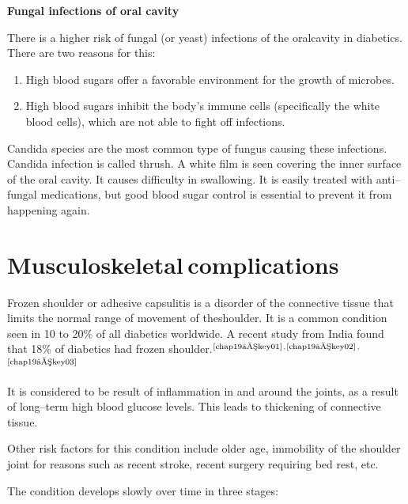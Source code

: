 \noindent\textbf{Fungal infections of oral cavity}

There is a higher risk of fungal (or yeast) infections of the oral\break cavity in diabetics. There are two reasons for this:

\begin{enumerate}[•]
\itemsep=0pt
\item High blood sugars offer a favorable environment for the growth of microbes.
\item High blood sugars inhibit the body’s immune cells (specifically the white blood cells), which are not able to fight off infections.
\end{enumerate}

Candida species are the most common type of fungus causing these infections. Candida infection is called thrush. A white film is seen covering the inner surface of the oral cavity. It causes difficulty in swallowing. It is easily treated with anti–fungal medications, but good blood sugar control is essential to prevent it from happening again.

\newpage

\renewcommand{\thechapter}{\arabic{chapter}}
\chapter{Musculoskeletal complications}\label{chap19}


\vskip 6pt
Frozen shoulder or adhesive capsulitis is a disorder of the conne\-ctive tissue that limits the normal range of movement of the\break shoulder. It is a common condition seen in 10 to 20\% of all diabetics worldwide. A recent study from India found that 18\% of diabetics had frozen shoulder.$^{\text{\cite{chap19–key01}}}$$^,$$^{\text{\cite{chap19–key02}}}$$^,$$^{\text{\cite{chap19–key03}}}$


It is considered to be result of inflammation in and around the joints, as a result of long–term high blood glucose levels. This leads to thicke\-ning of connective tissue.


Other risk factors for this condition include older age, immobility of the shoulder joint for reasons such as recent stroke, recent surgery requiring bed rest, etc.

\vskip 5pt
\noindent The condition develops slowly over time in three stages:

